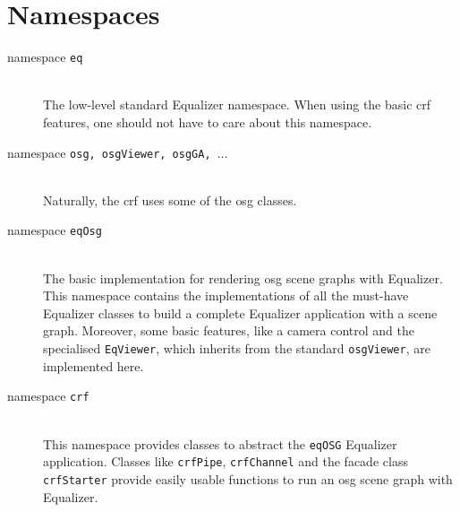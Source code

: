 \section{Namespaces}
\begin{description}
	\item[namespace \texttt{eq}] \hfill\\The low-level standard Equalizer namespace. When using the basic \gls{crf} features, one should not have to care about this namespace.
	\item[namespace \texttt{osg, osgViewer, osgGA, $\dots$}] \hfill\\Naturally, the \gls{crf} uses some of the \gls{osg} classes.
	\item[namespace \texttt{eqOsg}] \hfill\\The basic implementation for rendering \gls{osg} scene graphs with Equalizer. This namespace contains the implementations of all the must-have Equalizer classes to build a complete Equalizer application with a scene graph. Moreover, some basic features, like a camera control and the specialised \texttt{EqViewer}, which inherits from the standard \texttt{osgViewer}, are implemented here.
	\item[namespace \texttt{crf}] \hfill\\This namespace provides classes to abstract the \texttt{eqOSG} Equalizer application. Classes like \texttt{crfPipe}, \texttt{crfChannel} and the facade class \texttt{crfStarter} provide easily usable functions to run an \gls{osg} scene graph with Equalizer.
\end{description} 

